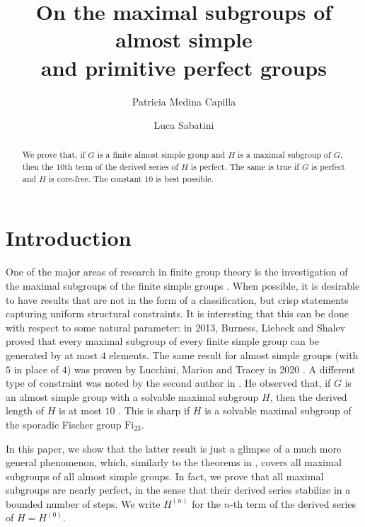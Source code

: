 \documentclass[11pt]{amsart}
\author[Patricia Medina Capilla]{Patricia Medina Capilla}
\author[Luca Sabatini]{Luca Sabatini}
\numberwithin{equation}{section}
\theoremstyle{definition}
\theoremstyle{remark}
\begin{document}
 
\title[Maximal subgroups of almost simple and perfect groups]{On the maximal subgroups of almost simple\\and primitive perfect groups}

\maketitle 

\begin{abstract} 
We prove that, if $G$ is a finite almost simple group and $H$ is a maximal subgroup of $G$, then the $10$th term of the derived series of $H$ is perfect.
The same is true if $G$ is perfect and $H$ is core-free.
The constant $10$ is best possible.
\end{abstract} 



\vspace{0.5cm}
\section{Introduction} 

One of the major areas of research in finite group theory is the investigation of the maximal subgroups of the
finite simple groups \cite{KL90}.
When possible, it is desirable to have results that are not in the form of a classification, but crisp statements capturing uniform structural constraints.
It is interesting that this can be done with respect to some natural parameter:
in 2013, Burness, Liebeck and Shalev \cite{BLS13} proved that every maximal subgroup of every finite simple group can be generated by at most $4$ elements.
The same result for almost simple groups (with $5$ in place of $4$)
was proven by Lucchini, Marion and Tracey in 2020 \cite{LMT20}.
A different type of constraint was noted by the second author in \cite{Sab26}.
He observed that, if $G$ is an almost simple group with a solvable maximal subgroup $H$, then the derived length of $H$ is at most $10$ \cite[Th.~1.4]{Sab26}.
This is sharp if $H$ is a solvable maximal subgroup of the sporadic Fischer group $\mathrm{Fi}_{23}$.

In this paper, we show that the latter result is just a glimpse of a much more general phenomenon, which, similarly to the theorems in \cite{BLS13,LMT20}, covers all maximal subgroups of all almost simple groups.
In fact, we prove that all maximal subgroups are nearly perfect,
in the sense that their derived series stabilize in a bounded number of steps.
We write $H^{(n)}$ for the $n$-th term of the derived series of $H=H^{(0)}$.
\end{document}
